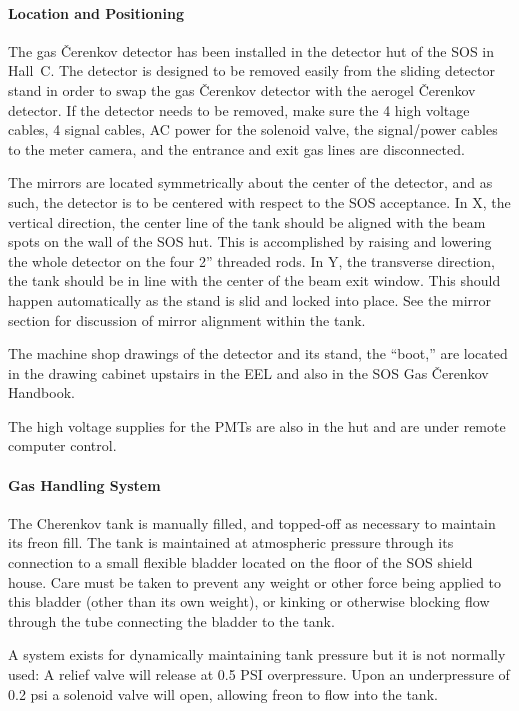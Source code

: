 \begin{obsolete}
\paragraph{Location and Positioning}

	 The gas \v{C}erenkov detector has been installed in the detector
hut of the SOS in Hall~C. The detector is designed to be removed easily
from the sliding detector stand in order to swap the gas \v{C}erenkov
detector with the aerogel \v{C}erenkov detector.  If the detector needs to
be removed, make sure the 4 high voltage cables, 4 signal cables, AC
power for the solenoid valve, the signal/power cables to the meter
camera, and the entrance and exit gas lines are disconnected.

	The mirrors are located symmetrically about the center of the
detector, and as such, the detector is to be centered with respect to
the SOS acceptance.  In X, the vertical direction, the center line of
the tank should be aligned with the beam spots on the wall of the SOS
hut.  This is accomplished by raising and lowering the whole detector
on the four 2'' threaded rods.  In Y, the transverse direction, the
tank should be in line with the center of the beam exit window.  This
should happen automatically as the stand is slid and locked into
place.  See the mirror section for discussion of mirror alignment
within the tank.

	The machine shop drawings of the detector and its stand, the
``boot,'' are located in the drawing cabinet upstairs in the EEL and
also in the SOS Gas \v{C}erenkov Handbook.

	The high voltage supplies for the PMTs are also in the hut and
are under remote computer control.

\paragraph{Gas Handling System}

The Cherenkov tank is manually filled, and topped-off as necessary to
maintain its freon fill.
The tank is maintained at atmospheric pressure through its
connection to a small flexible bladder located on the floor of the
SOS shield house. Care must be taken to prevent any weight or other
force being applied to this bladder (other than its own weight), or
kinking or otherwise blocking flow through the tube connecting the
bladder to the tank.

	A system exists for dynamically maintaining tank pressure but it 
is not normally used:  A relief valve will release at 0.5 PSI
overpressure. Upon an underpressure of 0.2 psi a solenoid valve 
will open, allowing freon to flow
into the tank.  


\end{obsolete}
